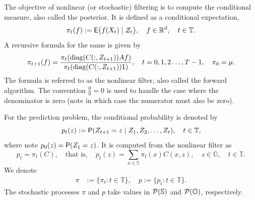 \documentclass[twoside,11pt]{article}
\def\Re{\mathbb{R}}
\newcommand{\field}[1]{\mathbb{#1}}
\def\Re{\field{R}}
\def\clP{{\cal P}}
\def\clZ{{\cal Z}}
\def\E{{\sf E}}
\def\clZ{{\cal Z}}
\def\bS{\begin{slide}}
\newcommand{\newP}[1]{\medskip\noindent{\bf #1:}}
\def\Re{\mathbb{R}}
\def\E{{\sf E}}
\def\clP{{\cal P}}
\def\clZ{{\cal Z}}
\renewcommand{\Re}{\mathbb{R}}
\def\clP{{\cal P}}
\def\clZ{{\cal Z}}
\def\E{{\sf E}}
\def\bS{\mathbb{S}}
\def\bO{\mathbb{O}}
\def\ones{{\sf 1}}
\def\sP{{\sf P}}
\begin{document}
\newP{Nonlinear filter} 
The objective of nonlinear (or stochastic) filtering is to compute the conditional measure, also called the posterior. 
It is defined as a conditional expectation,
\begin{equation*}
  \pi_t(f):= \E\big(f(X_t)\mid \clZ_t\big),\quad f \in \Re^d,\quad t\in\mathbb{T}.
\end{equation*}
A recursive formula for the same is given by
\begin{equation*}
  \pi_{t+1}(f) =  \frac{\pi_t(\text{diag}(C(:,Z_{t+1})) Af)}{\pi_t(\text{diag}(C(:,Z_{t+1}))\ones)},\quad t=0,1,2\hdots,T-1,\quad \pi_0=\mu.  
\end{equation*}
The formula is referred to as the nonlinear filter, also called the forward algorithm.  
The convention $\frac{0}{0}=0$ is used to handle the case where the denominator is zero (note in which case the numerator must also be zero).

For the prediction problem, the conditional probability is denoted by
\begin{equation*}\label{eq:prediction_problem}
p_{t}(z):= \sP(Z_{t+1}=z \mid Z_1,Z_2,\hdots,Z_t), \quad t\in\mathbb{T},
\end{equation*}
where note $p_0(z) = \sP(Z_{1}=z)$.  
It is computed from the nonlinear filter as
\begin{equation*}
p_t = \pi_t(C),\quad \text{that is}, \quad p_{t}(z) = \sum_{x\in\bS} \pi_t(x) C(x,z),\quad z\in\bO,\quad t\in\mathbb{T}.
\end{equation*}
We denote
\begin{align*}
  \pi &:= \{\pi_t:t\in \mathbb{T}\},\quad 
  p := \{p_t: t\in \mathbb{T}\}.
\end{align*}
The stochastic processes $\pi$ and $p$ take values in $\clP(\bS)$ and
$\clP(\bO)$, respectively.  



\end{document}
